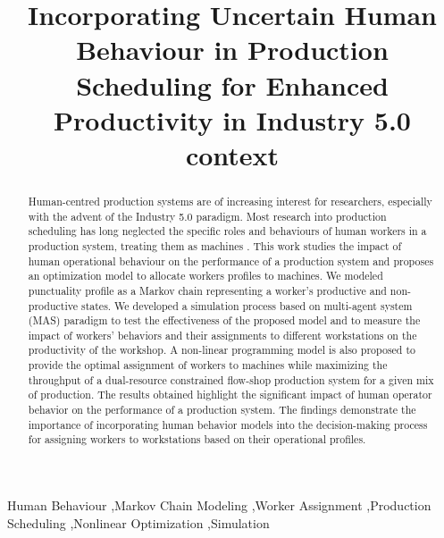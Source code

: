\documentclass[review,12pt, 3p, times]{elsarticle}
\begin{document}
\begin{frontmatter}
\title{Incorporating Uncertain Human Behaviour in Production Scheduling for Enhanced Productivity in Industry 5.0 context}



\begin{abstract}
Human-centred production systems are of increasing interest for researchers, especially with the advent of the Industry 5.0 paradigm. Most research into production scheduling has long neglected the specific roles and  behaviours of human workers in a production system, treating them as machines . This work studies the impact of human operational behaviour on the performance of a production system and proposes an optimization model to allocate workers profiles to machines. We modeled punctuality profile as a Markov chain representing a worker's productive and non-productive states. We developed a simulation process based on multi-agent system (MAS) paradigm to test the effectiveness of the proposed model and to measure the impact of workers' behaviors and their assignments to different workstations on the productivity of the workshop. A non-linear programming model is also proposed to provide the optimal assignment of workers to machines while maximizing the throughput of a dual-resource constrained flow-shop production system for a given mix of production. The results obtained highlight the significant impact of human operator behavior on the performance of a production system. The findings demonstrate the importance of incorporating human behavior models into the decision-making process for assigning workers to workstations based on their operational profiles.
\end{abstract}


\begin{keyword} 
Human Behaviour \sep Markov Chain Modeling \sep Worker Assignment   \sep Production Scheduling \sep Nonlinear Optimization \sep Simulation 
\end{keyword}
\end{frontmatter}
\end{document}
